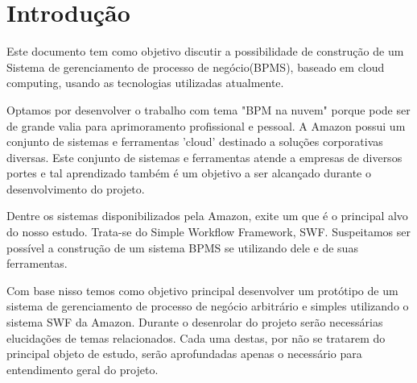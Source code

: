 \chapter*[Introdução]{Introdução}


Este documento tem como objetivo discutir a possibilidade de construção de um Sistema de gerenciamento de processo de negócio(BPMS), baseado em cloud computing, usando as tecnologias utilizadas atualmente.

Optamos por desenvolver o trabalho com tema "BPM na nuvem" porque pode ser de grande valia para aprimoramento
profissional e pessoal. A Amazon possui um conjunto de sistemas e ferramentas 'cloud' destinado a soluções corporativas diversas.
Este conjunto de sistemas e ferramentas atende a empresas de diversos portes e tal aprendizado também é um objetivo a ser alcançado durante o desenvolvimento do projeto.

Dentre os sistemas disponibilizados pela Amazon, exite um que é o principal alvo do nosso estudo. Trata-se do Simple Workflow Framework, SWF. Suspeitamos ser possível a construção de um sistema BPMS se utilizando dele e de suas ferramentas.

Com base nisso temos como objetivo principal desenvolver um protótipo de um sistema de gerenciamento de processo de negócio arbitrário e simples utilizando o sistema SWF da Amazon. Durante o desenrolar do projeto serão necessárias elucidações de temas relacionados. Cada uma destas, por não se tratarem do principal objeto de estudo, serão aprofundadas apenas o necessário para entendimento geral do projeto.


\begin{quote}



\end{quote}

